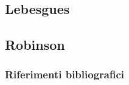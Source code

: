 \documentclass[8pt]{beamer}
\begin{document}
\subsection{Lebesgues}

\subsection{Robinson}



\begin{frame} %

  \frametitle{Riferimenti bibliografici}
  
  \scriptsize{}
  
  
\end{frame}
\end{document}
